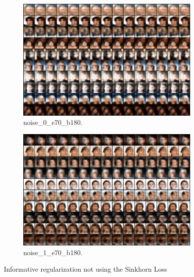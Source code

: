 \begin{figure}[!htbp]
\begin{subfigure}[t]{0.98\textwidth}
   \includegraphics[width=\textwidth,max height=0.17\textheight,center]{2019-04-30/celeba/fixed-cost/info/noise_0_e70_b180.png}
   \caption{noise_0_e70_b180.}
   \label{fig:.._.._notes_journal_figures_2019-04-30_celeba_fixed-cost_info-e}
\end{subfigure}
\begin{subfigure}[t]{0.98\textwidth}
   \includegraphics[width=\textwidth,max height=0.17\textheight,center]{2019-04-30/celeba/fixed-cost/info/noise_1_e70_b180.png}
   \caption{noise_1_e70_b180.}
   \label{fig:.._.._notes_journal_figures_2019-04-30_celeba_fixed-cost_info-f}
\end{subfigure}
   \caption{Informative regularization not using the Sinkhorn Loss}
   \label{fig:2019-04-30_celeba_fixed-cost_info}
\end{figure}